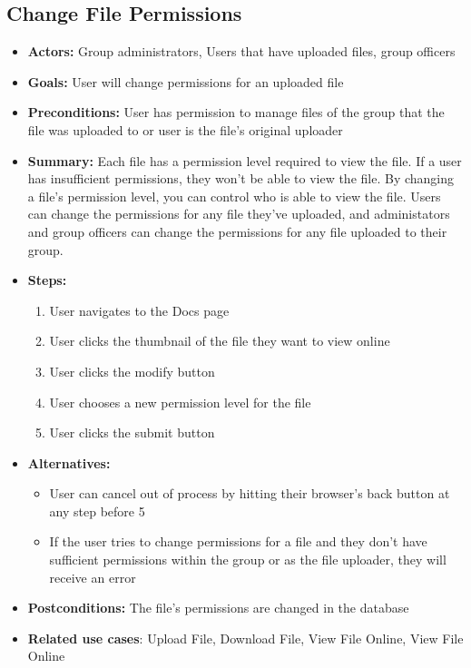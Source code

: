      \subsection{Change File Permissions}
     \begin{itemize}
          \item{\textbf{Actors:} Group administrators, Users that have uploaded files, 
		   group officers}
          \item{\textbf{Goals:} User will change permissions for an uploaded file}
          \item{\textbf{Preconditions:} User has permission to manage files of the 
                 group that the file was uploaded to or user is the 
		   file's original uploader}
          \item{\textbf{Summary:} Each file has a permission level required to view the file. 
		   If a user has insufficient permissions, they won't be able to view the file. 
		   By changing a file's permission level, you can control who is able to view the file. 
		   Users can change the permissions for any file they've uploaded, and administators and 
		   group officers can change the permissions for any file uploaded to their group.}
	  \item{\textbf{Steps:}}
	  \begin{enumerate}
	       \item{User navigates to the Docs page}
	       \item{User clicks the thumbnail of the file they want to view online}
	       \item{User clicks the modify button}
	       \item{User chooses a new permission level for the file}
		\item{User clicks the submit button}
	  \end{enumerate}
	  \item{\textbf{Alternatives:}}
	  \begin{itemize}
	       \item{User can cancel out of process by hitting their 
		     browser's back button at any step before 5}
	       \item{If the user tries to change permissions for a file and they don't have
		      sufficient permissions within the group or as the file uploader, 
		      they will receive an error}
	  \end{itemize}
	  \item{\textbf{Postconditions:} The file's permissions are changed in the database}
	  \item{\textbf{Related use cases}: Upload File, Download File, 
		 View File Online, View File Online}
     \end{itemize}
